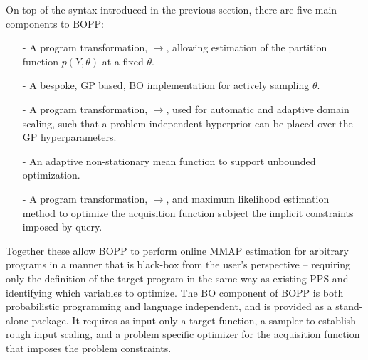 
On top of the syntax introduced in the previous section, there are five main components to BOPP:
\vspace{-5pt}
\begin{itemize}
	\setlength\itemsep{-0.2em}
	\item[-] A program transformation, $\rightarrow$\qmarg, allowing estimation of the partition function $p(Y,\theta)$ at a fixed $\theta$.
	\item[-] A bespoke, GP based, BO implementation for actively sampling $\theta$.
	\item[-] A program transformation, $\rightarrow$\qprior,  used for automatic and adaptive domain scaling, such that a problem-independent hyperprior can be placed over the GP hyperparameters.
	\item[-] An adaptive non-stationary mean function to support unbounded optimization.
	\item[-] A program transformation, $\rightarrow$\qacq, and maximum likelihood estimation method to optimize the acquisition function subject the implicit constraints imposed by query.
\end{itemize}
\vspace{-5pt}
Together these allow BOPP to perform online MMAP estimation for arbitrary programs in a manner that is black-box from the user's perspective -- requiring only the definition of the target program in the same way as existing PPS and identifying which variables to optimize.  The BO component of BOPP is both probabilistic programming and language independent, and is provided as a stand-alone package.  It requires as input only a target function, a sampler to establish rough input scaling, and a problem specific optimizer for the acquisition function that imposes the problem constraints.  %


